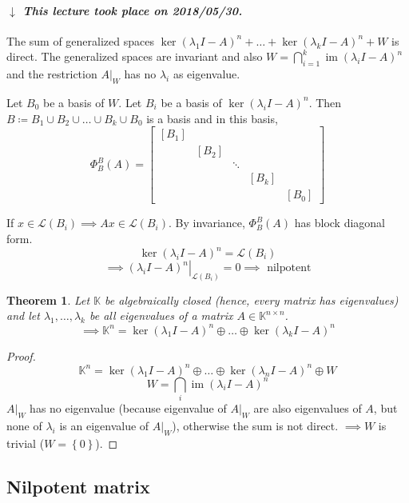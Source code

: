 \documentclass[a4paper]{article}
\newcounter{lecref}[section]
\numberwithin{lecref}{section}
\newtheorem{theorem}[lecref]{Theorem}
\newcommand{\set}[1]{\left\{#1\right\}}
\newcommand{\dateref}[1]{%
  \begin{mdframed}[backgroundcolor=gray!10,innerbottommargin=0pt,innertopmargin=0pt]
    \paragraph{\textit{$\downarrow$ This lecture took place on #1.}}%
  \end{mdframed}%
}
\DeclareMathOperator{\im}{im}
\begin{document}
\dateref{2018/05/30}

The sum of generalized spaces $\ker(\lambda_1 I - A)^n + \dots + \ker(\lambda_k I - A)^n + W$ is direct.
The generalized spaces are invariant and also $W = \bigcap_{i=1}^k \im(\lambda_i I - A)^n$ and the
restriction $A|_W$ has no $\lambda_i$ as eigenvalue.

Let $B_0$ be a basis of $W$. Let $B_i$ be a basis of $\ker(\lambda_i I - A)^n$.
Then $B \coloneqq B_1 \cup B_2 \cup \dots \cup B_k \cup B_0$ is a basis and in this basis,
\[
  \Phi_B^B(A) = \begin{bmatrix}
    [B_1] &       &        &       &       \\
          & [B_2] &        &       &       \\
          &       & \ddots &       &       \\
          &       &        & [B_k] &       \\
          &       &        &       & [B_0]
  \end{bmatrix}
\]

If $x \in \mathcal L(B_i) \implies Ax \in \mathcal L(B_i)$.
By invariance, $\Phi_B^B(A)$ has block diagonal form.
\[ \ker(\lambda_i I - A)^n = \mathcal L(B_i) \]
\[ \implies \left. (\lambda_i I - A)^n \right|_{\mathcal L(B_i)} = 0 \implies \text{ nilpotent} \]

\begin{theorem} %
  \label{thm:1115}
  Let $\mathbb K$ be algebraically closed (hence, every matrix has eigenvalues)
  and let $\lambda_1, \dots, \lambda_k$ be all eigenvalues of a matrix $A \in \mathbb K^{n\times n}$.
  \[ \implies \mathbb K^{n} = \ker(\lambda_1 I - A)^n \oplus \dots \oplus \ker(\lambda_k I - A)^n \]
\end{theorem}

\begin{proof}
  \[ \mathbb K^n = \ker(\lambda_1 I - A)^n \oplus \dots \oplus \ker(\lambda_n I - A)^n \oplus W \]
  \[ W = \bigcap_i \im(\lambda_i I - A)^n \]
  $A|_W$ has no eigenvalue (because eigenvalue of $A|_W$ are also eigenvalues of $A$, but none of $\lambda_i$ is an eigenvalue of $A|_W$), otherwise the sum is not direct.
  $\implies W$ is trivial ($W = \set{0}$).
\end{proof}

\subsection{Nilpotent matrix}
\end{document}
